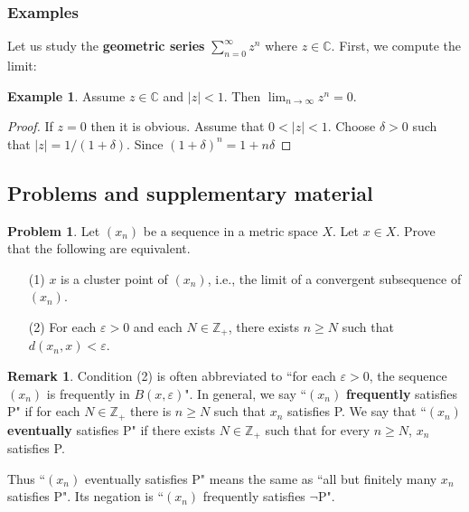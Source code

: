 \documentclass[12pt,b5paper,notitlepage]{article}
\theoremstyle{definition}
\newtheorem{eg}[df]{Example}
\newtheorem{rem}[df]{Remark}
\newtheorem{prob}{Problem}[section]
\theoremstyle{plain}
\newcommand{\Cbb}{\mathbb C}
\newcommand{\Zbb}{\mathbb Z}
\newcommand{\eps}{\varepsilon}
\numberwithin{equation}{section}
\begin{document}
\subsubsection{Examples}


Let us study the \textbf{geometric series} $\sum_{n=0}^\infty z^n$ where $z\in\Cbb$. First, we compute the limit:
\begin{eg}
Assume $z\in\Cbb$ and $|z|<1$. Then $\lim_{n\rightarrow\infty}z^n=0$. 
\end{eg}

\begin{proof}
If $z=0$ then it is obvious. Assume that $0<|z|<1$. Choose $\delta>0$ such that $|z|=1/(1+\delta)$. Since $(1+\delta)^n=1+n\delta$
\end{proof}









\subsection{Problems and supplementary material}



\begin{prob}\label{lb64}
Let $(x_n)$ be a sequence in a metric space $X$. Let $x\in X$. Prove that the following are equivalent.
\begin{itemize}
\item[(1)] $x$ is a cluster point of $(x_n)$, i.e., the limit of a convergent subsequence of $(x_n)$.
\item[(2)] For each $\eps>0$ and each $N\in\Zbb_+$, there exists $n\geq N$ such that $d(x_n,x)<\eps$.
\end{itemize}
\end{prob}


\begin{rem}
Condition (2) is often abbreviated to ``for each $\eps>0$, the sequence $(x_n)$ is frequently in $B(x,\eps)$". In general, we say ``$(x_n)$ \textbf{frequently} satisfies P" if for each $N\in\Zbb_+$ there is $n\geq N$ such that $x_n$ satisfies P. We say that ``$(x_n)$ \textbf{eventually} satisfies P" if there exists $N\in\Zbb_+$ such that for every $n\geq N$, $x_n$ satisfies P.    

Thus ``$(x_n)$ eventually satisfies P" means the same as ``all but finitely many $x_n$ satisfies P". Its negation is ``$(x_n)$ frequently satisfies $\neg$P".   \hfill\qedsymbol
\end{rem}
\end{document}
